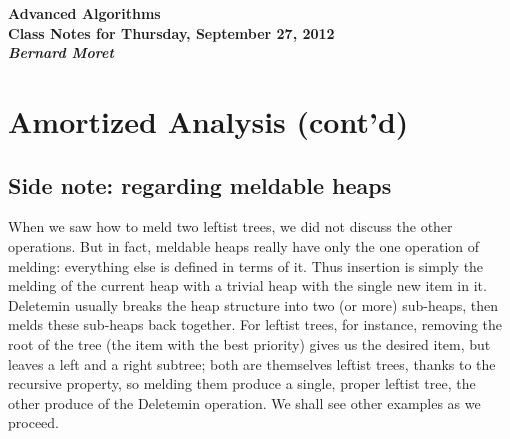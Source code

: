\documentclass[11pt]{article}
\begin{document}
\begin{center}
  \LARGE\bf Advanced Algorithms\\

  \Large\sf
  Class Notes for Thursday, September 27, 2012\\

  \it
  Bernard Moret
\end{center}

\bigskip

\section{Amortized Analysis (cont'd)}
\subsection{Side note: regarding meldable heaps}
When we saw how to meld two leftist trees, we did not discuss the
other operations.  But in fact, meldable heaps really have only the
one operation of melding: everything else is defined in terms of it.
Thus insertion is simply the melding of the current heap with a trivial
heap with the single new item in it.  Deletemin usually breaks the heap
structure into two (or more) sub-heaps, then melds these sub-heaps back together.
For leftist trees, for instance, removing the root of the tree (the item
with the best priority) gives us the desired item, but leaves a left
and a right subtree; both are themselves leftist trees, thanks to the
recursive property, so melding them produce a single, proper leftist tree,
the other produce of the Deletemin operation.  We shall see other examples
as we proceed.
\end{document}
